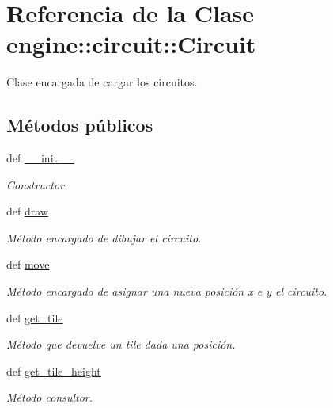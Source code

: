 \hypertarget{classengine_1_1circuit_1_1Circuit}{
\section{\-Referencia de la \-Clase engine\-:\-:circuit\-:\-:\-Circuit}
\label{classengine_1_1circuit_1_1Circuit}
}


\-Clase encargada de cargar los circuitos.  


\subsection*{\-Métodos públicos}
\begin{DoxyCompactItemize}
\item 
def \hyperlink{classengine_1_1circuit_1_1Circuit_ad552046bf9134fe1e94cc1db0e972093}{\-\_\-\-\_\-init\-\_\-\-\_\-}
\begin{DoxyCompactList}\small\item\em \-Constructor. \end{DoxyCompactList}\item 
def \hyperlink{classengine_1_1circuit_1_1Circuit_a5205d0022efb2451662706ef898e3b29}{draw}
\begin{DoxyCompactList}\small\item\em \-Método encargado de dibujar el circuito. \end{DoxyCompactList}\item 
def \hyperlink{classengine_1_1circuit_1_1Circuit_a79a7d47e201e0cb22c32e4b2db5e3061}{move}
\begin{DoxyCompactList}\small\item\em \-Método encargado de asignar una nueva posición x e y el circuito. \end{DoxyCompactList}\item 
def \hyperlink{classengine_1_1circuit_1_1Circuit_ac4ab6a87f3d2e77b7382f3d62101acde}{get\-\_\-tile}
\begin{DoxyCompactList}\small\item\em \-Método que devuelve un tile dada una posición. \end{DoxyCompactList}\item 
def \hyperlink{classengine_1_1circuit_1_1Circuit_adee560513397618857b83cb9b61be0d5}{get\-\_\-tile\-\_\-height}
\begin{DoxyCompactList}\small\item\em \-Método consultor. \end{DoxyCompactList}\item 

\end{DoxyCompactItemize}
